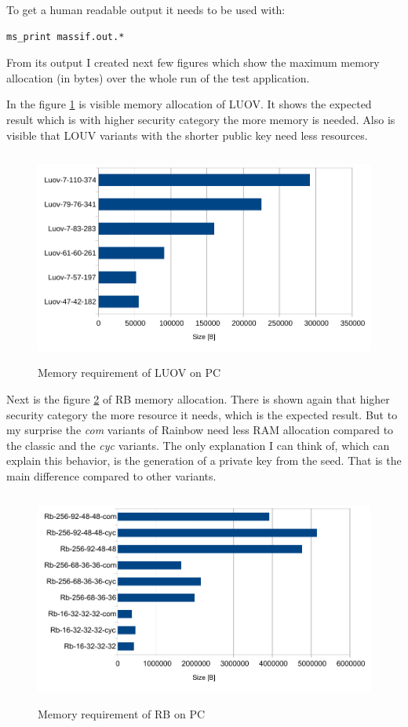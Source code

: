 \documentclass[thesis=M,english]{FITthesis}[2019/12/23]
\begin{document}
\noindent
To get a human readable output it needs to be used with:
\begin{lstlisting}[frame=single]
ms_print massif.out.*
\end{lstlisting}
\noindent
From its output I created next few figures which show the maximum memory allocation (in bytes) over the whole run of the test application. 

\bigskip
\noindent
In the figure \ref{mem-pc-luov} is visible memory allocation of LUOV. It shows the expected result which is with higher security category the more memory is needed. Also is visible that LOUV variants with the shorter public key need less resources.

\begin{figure}[H]
\centering
\includegraphics[width=13cm,height=7cm]{images/mem-pc-luov.pdf}
\caption{Memory requirement of LUOV on PC}
\label{mem-pc-luov}
\end{figure}

\noindent
Next is the figure \ref{mem-pc-rb} of RB memory allocation. There is shown again that higher security category the more resource it needs, which is the expected result. But to my surprise the \textit{com} variants of Rainbow need less RAM allocation compared to the classic and the \textit{cyc} variants. The only explanation I can think of, which can explain this behavior, is the generation of a private key from the seed. That is the main difference compared to other variants.
\begin{figure}[H]
\centering
\includegraphics[width=13cm,height=7cm]{images/mem-pc-rb.pdf}
\caption{Memory requirement of RB on PC}
\label{mem-pc-rb}
\end{figure}
\end{document}
